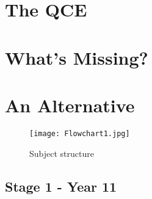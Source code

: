 \documentclass[12pt]{report}
\begin{document}
\chapter{The QCE}





\chapter{What's Missing?}




\chapter{An Alternative}

\begin{figure}[H]
    \centering
    \texttt{[image: Flowchart1.jpg]}
    \caption{Subject structure}
\end{figure}

\section{Stage 1 - Year 11}
\end{document}

